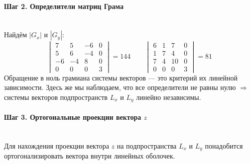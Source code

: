 \documentclass{article}
\begin{document}
    \paragraph*{Шаг 2. Определители матриц Грама} \, \\
    Найдём $\left\lvert G_x\right\rvert$ и $\left\lvert G_y\right\rvert $:
    $$
        \begin{vmatrix}
            7  & 5  & -6 & 0 \\
            5  & 6  & -4 & 0 \\
            -6 & -4 & 8  & 0 \\
            0  & 0  & 0  & 3
        \end{vmatrix} = 144 \qquad
        \begin{vmatrix}
            6 & 1 & 7  & 0 \\
            1 & 7 & 4  & 0 \\
            7 & 4 & 10 & 0 \\
            0 & 0 & 0  & 3
        \end{vmatrix} = 81
    $$
    Обращение в ноль грамиана системы векторов --- это критерий их линейной зависимости. Здесь же мы наблюдаем, что все определители не равны нулю $\Rightarrow$ системы векторов подпространств $L_x$ и $L_y$ линейно независимы.

    \paragraph*{Шаг 3. Ортогональные проекции вектора $z$} \, \\
    Для нахождения проекции вектора $z$ на подпространства $L_x$ и $L_y$ понадобится ортогонализировать вектора внутри линейных оболочек.
\end{document}
